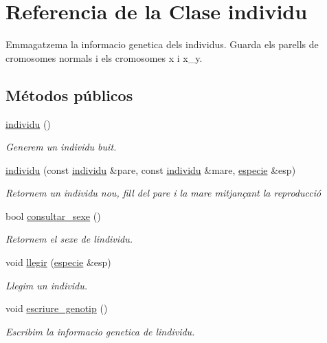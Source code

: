 \hypertarget{classindividu}{}\section{Referencia de la Clase individu}
\label{classindividu}


Emmagatzema la informacio genetica dels individus. Guarda els parells de cromosomes normals i els cromosomes x i x\+\_\+y.  


\subsection*{Métodos públicos}
\begin{DoxyCompactItemize}
\item 
\hyperlink{classindividu_af1ba9dc86a04bff6b41ed2d1cf3202b9}{individu} ()
\begin{DoxyCompactList}\small\item\em Generem un individu buit. \end{DoxyCompactList}\item 
\hyperlink{classindividu_a391c6415dd94b28819ba19f07acac69b}{individu} (const \hyperlink{classindividu}{individu} \&pare, const \hyperlink{classindividu}{individu} \&mare, \hyperlink{classespecie}{especie} \&esp)
\begin{DoxyCompactList}\small\item\em Retornem un individu nou, fill del pare i la mare mitjançant la reproducció \end{DoxyCompactList}\item 
bool \hyperlink{classindividu_a30ab21dfd66b20a748bcf41e0b3108a0}{consultar\+\_\+sexe} ()
\begin{DoxyCompactList}\small\item\em Retornem el sexe de l\textquotesingle{}individu. \end{DoxyCompactList}\item 
void \hyperlink{classindividu_a6cfcb4f2472be86eb3416da90dc721be}{llegir} (\hyperlink{classespecie}{especie} \&esp)
\begin{DoxyCompactList}\small\item\em Llegim un individu. \end{DoxyCompactList}\item 
void \hyperlink{classindividu_a8e9d5b4698e9d2d1838e5a512206768a}{escriure\+\_\+genotip} ()
\begin{DoxyCompactList}\small\item\em Escribim la informacio genetica de l\textquotesingle{}individu. \end{DoxyCompactList}\end{DoxyCompactItemize}
